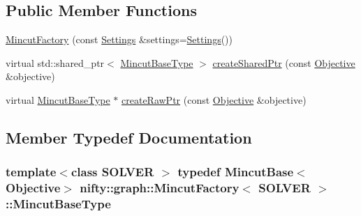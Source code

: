 \subsection*{Public Member Functions}
\begin{DoxyCompactItemize}
\item 
\hyperlink{classnifty_1_1graph_1_1MincutFactory_a802180089b5aa2154fd3e482f8f8c0b5}{Mincut\+Factory} (const \hyperlink{classnifty_1_1graph_1_1MincutFactory_a2933cb2ed374c3ad593e2bfafa4a12fa}{Settings} \&settings=\hyperlink{classnifty_1_1graph_1_1MincutFactory_a2933cb2ed374c3ad593e2bfafa4a12fa}{Settings}())
\item 
virtual std\+::shared\+\_\+ptr$<$ \hyperlink{classnifty_1_1graph_1_1MincutFactory_a5a23fd8e8d5be1d6b80a8936d530e23a}{Mincut\+Base\+Type} $>$ \hyperlink{classnifty_1_1graph_1_1MincutFactory_a868a6628c4f9421ee14b75e867cdf06d}{create\+Shared\+Ptr} (const \hyperlink{classnifty_1_1graph_1_1MincutFactory_a6f92b21c6eee586b7b986488e3b381bc}{Objective} \&objective)
\item 
virtual \hyperlink{classnifty_1_1graph_1_1MincutFactory_a5a23fd8e8d5be1d6b80a8936d530e23a}{Mincut\+Base\+Type} $\ast$ \hyperlink{classnifty_1_1graph_1_1MincutFactory_aca031f448c6127ab46fb1a6485d6a202}{create\+Raw\+Ptr} (const \hyperlink{classnifty_1_1graph_1_1MincutFactory_a6f92b21c6eee586b7b986488e3b381bc}{Objective} \&objective)
\end{DoxyCompactItemize}


\subsection{Member Typedef Documentation}
\hypertarget{classnifty_1_1graph_1_1MincutFactory_a5a23fd8e8d5be1d6b80a8936d530e23a}{}
\subsubsection[{Mincut\+Base\+Type}]{\setlength{\rightskip}{0pt plus 5cm}template$<$class S\+O\+L\+V\+E\+R $>$ typedef {\bf Mincut\+Base}$<${\bf Objective}$>$ {\bf nifty\+::graph\+::\+Mincut\+Factory}$<$ S\+O\+L\+V\+E\+R $>$\+::{\bf Mincut\+Base\+Type}}\label{classnifty_1_1graph_1_1MincutFactory_a5a23fd8e8d5be1d6b80a8936d530e23a}
\hypertarget{classnifty_1_1graph_1_1MincutFactory_a6f92b21c6eee586b7b986488e3b381bc}{}
